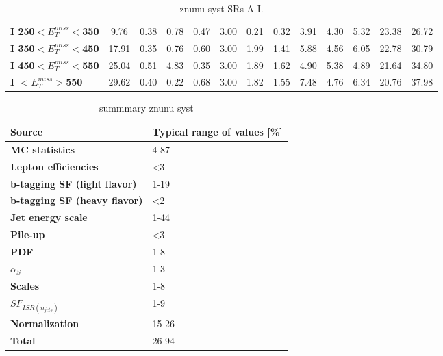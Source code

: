 \begin{table}[h]
\begin{center}
{\begin{tabular}{|l|cccccccccccc|}
\textbf{ I 250$<E_T^{miss}<$350}         & 9.76          & 0.38          & 0.78          & 0.47          & 3.00          & 0.21          & 0.32          & 3.91          & 4.30          & 5.32          & 23.38         & 26.72         \\
\textbf{ I 350$<E_T^{miss}<$450}         & 17.91         & 0.35          & 0.76          & 0.60          & 3.00          & 1.99          & 1.41          & 5.88          & 4.56          & 6.05          & 22.78         & 30.79         \\
\textbf{ I 450$<E_T^{miss}<$550}         & 25.04         & 0.51          & 4.83          & 0.35          & 3.00          & 1.89          & 1.62          & 4.90          & 5.38          & 4.89          & 21.64         & 34.80         \\
\textbf{ I $<E_T^{miss}>$550}    & 29.62         & 0.40          & 0.22          & 0.68          & 3.00          & 1.82          & 1.55          & 7.48          & 4.76          & 6.34          & 20.76         & 37.98         \\
\hline
\end{tabular}}
\caption[Table caption text]{znunu syst SRs A-I. }
\label{tab:SystZnunu}
\end{center}
\end{table}


\begin{table}[h]
\begin{center}
\begin{tabular}{|l|l|}
\hline
\textbf{Source}       & \textbf{Typical range of values} [\%]                       \\
\hline
\textbf{MC statistics}      &  4-87   \\
\hline
\textbf{Lepton efficiencies}              &  <3  \\
\textbf{b-tagging SF (light flavor)}      &  1-19  \\
\textbf{b-tagging SF (heavy flavor)}      &  <2  \\
\textbf{Jet energy scale}                 &  1-44  \\
\textbf{Pile-up}                          &  <3  \\
\hline
\textbf{PDF}                 &  1-8  \\
\textbf{$\alpha_{S}$}                 &  1-3  \\
\textbf{Scales}                 &  1-8  \\
\textbf{$SF_{ISR(n_{jets})}$}                 &  1-9  \\
\textbf{Normalization}                 &  15-26  \\
\hline
\textbf{Total}                 &  26-94  \\
\hline
\end{tabular}
\caption[Table caption text]{summmary znunu syst }
\label{tab:SysZnunuSum}
\end{center}
\end{table}


